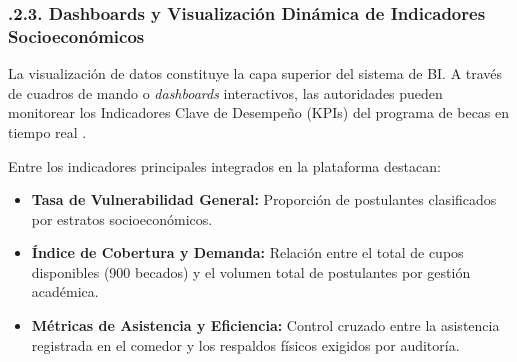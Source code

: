 \subsubsection{.2.3. Dashboards y Visualización Dinámica de Indicadores Socioeconómicos}\label{sec:bi_dashboards}

La visualización de datos constituye la capa superior del sistema de BI. A través de cuadros de mando o \textit{dashboards} interactivos, las autoridades pueden monitorear los Indicadores Clave de Desempeño (KPIs) del programa de becas en tiempo real \parencite{few2006dashboard}.

Entre los indicadores principales integrados en la plataforma destacan:

\begin{itemize}
    \item \textbf{Tasa de Vulnerabilidad General:} Proporción de postulantes clasificados por estratos socioeconómicos.

    \item \textbf{Índice de Cobertura y Demanda:} Relación entre el total de cupos disponibles (900 becados) y el volumen total de postulantes por gestión académica.

    \item \textbf{Métricas de Asistencia y Eficiencia:} Control cruzado entre la asistencia registrada en el comedor y los respaldos físicos exigidos por auditoría.
\end{itemize}
